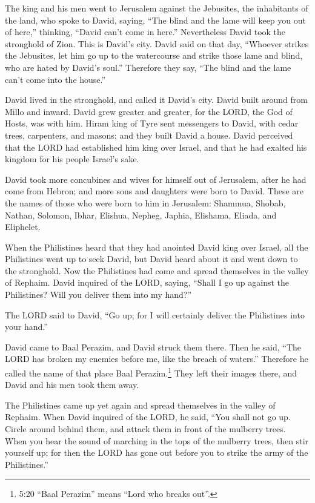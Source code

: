 \myverse{}The king and his men went to Jerusalem against the Jebusites, the
inhabitants of the land, who spoke to David, saying, “The blind and the lame will keep you out of here,”
thinking, “David can’t come in here.”
\myverse{}Nevertheless David took the stronghold of Zion. This is David’s city.
\myverse{}David said on that day, “Whoever strikes the Jebusites, let him go up to the
watercourse and strike those lame and blind, who are hated by David’s soul.” Therefore they say, “The
blind and the lame can’t come into the house.”

\myverse{}David lived in the stronghold, and called it David’s city. David
built around from Millo and inward.
\myverse{}David grew greater and greater, for the LORD, the God of Hosts, was with him.
\myverse{}Hiram king of Tyre sent messengers to David, with cedar trees, carpenters,
and masons; and they built David a house.
\myverse{}David perceived that the LORD had established him king over Israel, and that
he had exalted his kingdom for his people Israel’s sake.

\myverse{}David took more concubines and wives for himself out of Jerusalem,
after he had come from Hebron; and more sons and daughters were born to David.
\myverse{}These are the names of those who were born to him in Jerusalem: Shammua, Shobab,
Nathan, Solomon,
\myverse{}Ibhar, Elishua, Nepheg, Japhia,
\myverse{}Elishama, Eliada, and Eliphelet.

\myverse{}When the Philistines heard that they had anointed David king
over Israel, all the Philistines went up to seek David, but David heard about it and went down to the
stronghold.
\myverse{}Now the Philistines had come and spread themselves in the valley of Rephaim.
\myverse{}David inquired of the LORD, saying, “Shall I go up against the Philistines?
Will you deliver them into my hand?”

The LORD said to David, “Go up; for I will certainly deliver the Philistines into your hand.”

\myverse{}David came to Baal Perazim, and David struck them there. Then
he said, “The LORD has broken my enemies before me, like the breach of waters.” Therefore he called the
name of that place Baal Perazim.\footnote{5:20 “Baal Perazim” means “Lord who breaks out”.}
\myverse{}They left their images there, and David and his men took them away.

\myverse{}The Philistines came up yet again and spread themselves in the
valley of Rephaim.
\myverse{}When David inquired of the LORD, he said, “You shall not go up. Circle around
behind them, and attack them in front of the mulberry trees.
\myverse{}When you hear the sound of marching in the tops of the mulberry trees, then
stir yourself up; for then the LORD has gone out before you to strike the army of the Philistines.”

